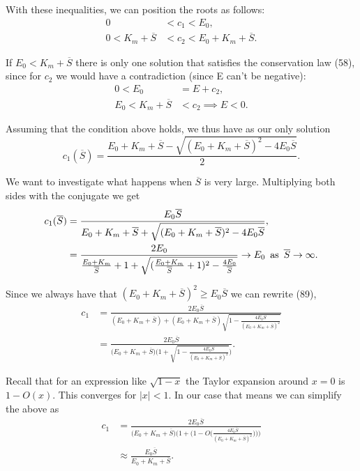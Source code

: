 \documentclass[12pt]{article}
\begin{document}
With these inequalities, we can position the roots as follows:
\begin{align}
  0 &< c_1 < E_0, \\
  0 < K_m + \overline{S} &< c_2 < E_0 + K_m + \overline{S}.
\end{align}

If $E_0 < K_m + \overline{S}$ there is only one solution that
satisfies the conservation law (58), since for $c_2$ we would have a
contradiction (since E can't be negative):
\begin{align}
  0 < E_0 &= E + c_2, \\
  E_0 < K_m + \overline{S} &< c_2 \implies E < 0.
\end{align}

Assuming that the condition above holds, we thus have as our only solution
\begin{equation}
  c_1(\overline{S}) = \frac{E_0 + K_m + \overline{S} - \sqrt{(E_0 +
      K_m + \overline{S})^2 - 4 E_0 \overline{S}}}{2}.
\end{equation}

We want to investigate what happens when $\overline{S}$ is very
large. Multiplying both sides with the conjugate we get
\begin{align}
  c_1(\overline{S}) &= \frac{E_0 \overline{S}}{E_0 + K_m + \overline{S} +
    \sqrt{(E_0 +K_m + \overline{S})^2 - 4 E_0 \overline{S}}}, \\
                    &= \frac{2 E_0}{\frac{E_0 + K_m}{\overline{S}} + 1 +
    \sqrt{(\frac{E_0 + K_m}{\overline{S}} + 1)^2 - \frac{4 E_0}{\overline{S}}}}
  \to  E_0 \enskip \text{as} \enskip \overline{S} \to \infty.
\end{align}

Since we always have that
$(E_0 + K_m + \overline{S})^2 \geq E_0 \overline{S}$ we can rewrite (89),
\begin{align}
  c_1 &= \frac{2 E_0 \overline{S}}
              {(E_0 + K_m + \overline{S}) + (E_0 + K_m + \overline{S})
              \sqrt{1- \frac{4 E_0 \overline{S}}
                            {(E_0 + K_m + \overline{S})^2}}} \\
      &= \frac{2 E_0 \overline{S}}
              {\Big(E_0 + K_m + \overline{S}\Big)
              \Big(1 + \sqrt{1- \frac{4 E_0 \overline{S}}
                  {(E_0 + K_m + \overline{S})^2}}\Big)}.
\end{align}

Recall that for an expression like $\sqrt{1-x}$ the Taylor expansion
around $x=0$ is $1 - O(x)$. This converges for $|x| < 1$. In our case
that means we can simplify the above as
\begin{align}
   c_1 &= \frac{2 E_0 \overline{S}}
              {\Big(E_0 + K_m + \overline{S}\Big)
               \Big(1 + \Big(1 -
                O\Big(\frac{4 E_0 \overline{S}}
                           {(E_0 + K_m + \overline{S})^2}\Big)\Big)\Big)} \\
      &\approx \frac{E_0 \overline{S}}
                    {E_0 + K_m + \overline{S}}.
\end{align}
\end{document}
